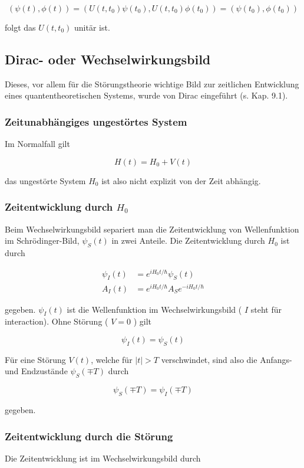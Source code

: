 \documentclass[10pt, letterpaper]{article}
\begin{document}
$$
(\psi(t), \phi(t))=\left(U\left(t, t_{0}\right) \psi\left(t_{0}\right), U\left(t, t_{0}\right) \phi\left(t_{0}\right)\right)=\left(\psi\left(t_{0}\right), \phi\left(t_{0}\right)\right)
$$

folgt das $U\left(t, t_{0}\right)$ unitär ist.

\subsection*{Dirac- oder Wechselwirkungsbild}
Dieses, vor allem für die Störungstheorie wichtige Bild zur zeitlichen Entwicklung eines quantentheoretischen Systems, wurde von Dirac eingeführt (s. Kap. 9.1).

\subsubsection*{Zeitunabhängiges ungestörtes System}
Im Normalfall gilt

$$
H(t)=H_{0}+V(t)
$$

das ungestörte System $H_{0}$ ist also nicht explizit von der Zeit abhängig.

\subsubsection*{Zeitentwicklung durch $H_{0}$}
Beim Wechselwirkungsbild separiert man die Zeitentwicklung von Wellenfunktion im Schrödinger-Bild, $\psi_{S}(t)$ in zwei Anteile. Die Zeitentwicklung durch $H_{0}$ ist durch

$$
\begin{aligned}
\psi_{I}(t) & =e^{i H_{0} t / \hbar} \psi_{S}(t) \\
A_{I}(t) & =e^{i H_{0} t / \hbar} A_{S} e^{-i H_{0} t / \hbar}
\end{aligned}
$$

gegeben. $\psi_{I}(t)$ ist die Wellenfunktion im Wechselwirkungsbild ( $I$ steht für interaction). Ohne Störung ( $V=0$ ) gilt

$$
\psi_{I}(t)=\psi_{S}(t)
$$

Für eine Störung $V(t)$, welche für $|t|>T$ verschwindet, sind also die Anfangs- und Endzustände $\psi_{S}(\mp T)$ durch

$$
\psi_{S}(\mp T)=\psi_{I}(\mp T)
$$

gegeben.

\subsubsection*{Zeitentwicklung durch die Störung}
Die Zeitentwicklung ist im Wechselwirkungsbild durch
\end{document}
